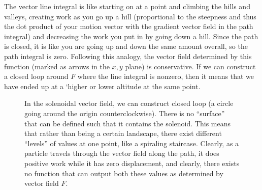 	The vector line integral is like starting on at a point and climbing the hills and valleys, creating work as you go up a hill (proportional to the steepness and thus the dot product of your motion vector with the gradient vector field in the path integral) and decreasing the work you put in by going down a hill. Since the path is closed, it is like you are going up and down the same amount overall, so the path integral is zero. Following this analogy, the vector field determined by this function (marked as arrows in the $x, y$ plane) is conservative. If we can construct a closed loop around $F$ where the line integral is nonzero, then it means that we have ended up at a `higher or lower altitude at the same point. 
		
	\begin{figure}[H]
		\centering 
		\caption{In the solenoidal vector field, we can construct closed loop (a circle going around the origin counterclockwise). There is no ``surface'' that can be defined such that it contains the solenoid. This means that rather than being a certain landscape, there exist different ``levels'' of values at one point, like a spiraling staircase. Clearly, as a particle travels through the vector field along the path, it does positive work while it has zero displacement, and clearly, there exists no function that can output both these values as determined by vector field $F$. } 
		\label{fig:solenoid_nonconservative}
	\end{figure}
		
